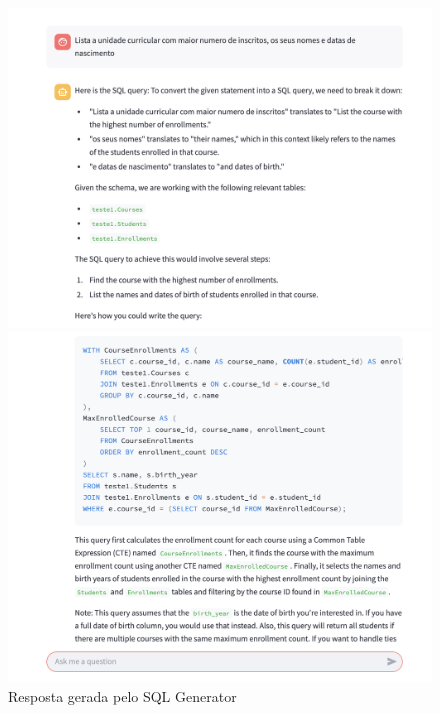\documentclass{article}
\begin{document}
\begin{figure}[ht]
    \centering
    \begin{minipage}{0.3\linewidth}
        \centering
        \includegraphics[width=\linewidth]{images/sql_generator2-1.png}
        \caption{Resposta gerada pelo SQL Generator}
        \label{fig:sql-generator2-1}
    \end{minipage}
    \hspace{0.01\linewidth} %
    \begin{minipage}{0.3\linewidth}
        \centering
        \includegraphics[width=\linewidth]{images/sql_generator2-2.png}

\end{minipage}
\end{figure}
\end{document}
